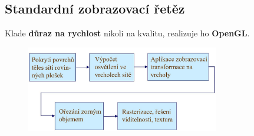 \subsection{Standardní zobrazovací řetěz}
Klade \textbf{důraz na rychlost }nikoli na kvalitu, realizuje ho \textbf{OpenGL}.
\begin{figure}[H]
\centering
\includegraphics[width=0.75\textwidth]{assets/5_retezec}
\end{figure}

